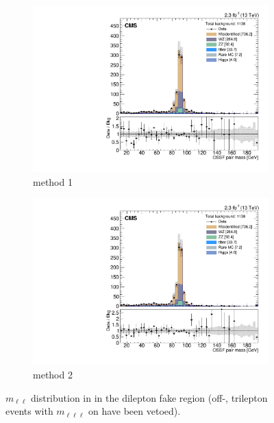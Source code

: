 \begin{figure}
\begin{center}
	\begin{subfigure}[b]{.7\textwidth}
		\includegraphics[width=\textwidth]{Strategy/Z_L3MET0to50_noAIC_OSSFCLOSEMLL}%
		\caption{method 1}
	\end{subfigure}
	\begin{subfigure}[b]{.7\textwidth}
		\includegraphics[width=\textwidth]{Strategy/Z_L3MET0to50_noAIC_MOSSF}
		\caption{method 2}
	\end{subfigure}
	\caption{$m_{\ell\ell}$ distribution in in the dilepton fake region (off-\Z, trilepton events with $m_{\ell\ell\ell}$ on \Z have been vetoed).
	\label{fig:app:Zbinning}}
\end{center}
\end{figure}

